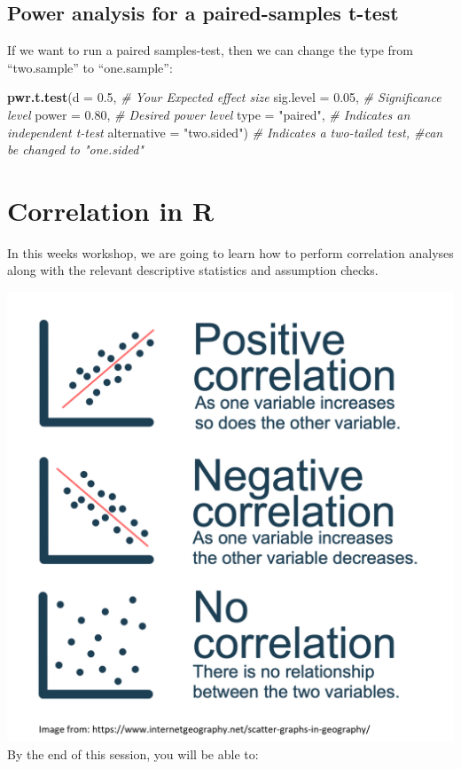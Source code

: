 \documentclass[
]{book}
\newenvironment{Shaded}{\begin{snugshade}}{\end{snugshade}}
\newcommand{\AttributeTok}[1]{\textcolor[rgb]{0.13,0.29,0.53}{#1}}
\newcommand{\CommentTok}[1]{\textcolor[rgb]{0.56,0.35,0.01}{\textit{#1}}}
\newcommand{\FloatTok}[1]{\textcolor[rgb]{0.00,0.00,0.81}{#1}}
\newcommand{\FunctionTok}[1]{\textcolor[rgb]{0.13,0.29,0.53}{\textbf{#1}}}
\newcommand{\NormalTok}[1]{#1}
\newcommand{\StringTok}[1]{\textcolor[rgb]{0.31,0.60,0.02}{#1}}
\begin{document}
\section{Power analysis for a paired-samples t-test}\label{power-analysis-for-a-paired-samples-t-test}

If we want to run a paired samples-test, then we can change the type from ``two.sample'' to ``one.sample'':

\begin{Shaded}
\begin{Highlighting}[]
\FunctionTok{pwr.t.test}\NormalTok{(}\AttributeTok{d =} \FloatTok{0.5}\NormalTok{,         }\CommentTok{\# Your Expected effect size}
           \AttributeTok{sig.level =} \FloatTok{0.05}\NormalTok{, }\CommentTok{\# Significance level}
           \AttributeTok{power =} \FloatTok{0.80}\NormalTok{,     }\CommentTok{\# Desired power level}
           \AttributeTok{type =} \StringTok{"paired"}\NormalTok{,  }\CommentTok{\# Indicates an independent t{-}test}
           \AttributeTok{alternative =} \StringTok{"two.sided"}\NormalTok{)  }\CommentTok{\# Indicates a two{-}tailed test, \#can be changed to "one.sided"}
\end{Highlighting}
\end{Shaded}

\chapter{Correlation in R}\label{correlation-in-r}

In this weeks workshop, we are going to learn how to perform correlation analyses along with the relevant descriptive statistics and assumption checks.

\includegraphics{img/Corrs.png} By the end of this session, you will be able to:
\end{document}
